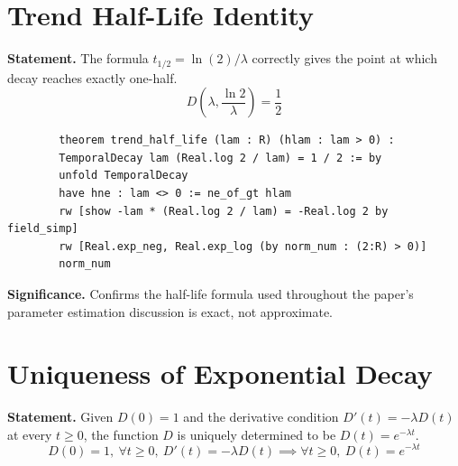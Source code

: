 \documentclass[11pt,a4paper]{article}
\begin{document}
	\section{Trend Half-Life Identity}
	
	\textbf{Statement.} The formula $t_{1/2} = \ln(2)/\lambda$ correctly gives the point at which decay reaches exactly one-half.
	\begin{equation}
		D\left(\lambda, \frac{\ln 2}{\lambda}\right) = \frac{1}{2}
	\end{equation}
	
	\begin{lstlisting}
		theorem trend_half_life (lam : R) (hlam : lam > 0) :
		TemporalDecay lam (Real.log 2 / lam) = 1 / 2 := by
		unfold TemporalDecay
		have hne : lam <> 0 := ne_of_gt hlam
		rw [show -lam * (Real.log 2 / lam) = -Real.log 2 by field_simp]
		rw [Real.exp_neg, Real.exp_log (by norm_num : (2:R) > 0)]
		norm_num
	\end{lstlisting}
	
	\noindent\textbf{Significance.} Confirms the half-life formula used throughout the paper's parameter estimation discussion is exact, not approximate.
	
	\section{Uniqueness of Exponential Decay}
	
	\textbf{Statement.} Given $D(0) = 1$ and the derivative condition $D'(t) = -\lambda D(t)$ at every $t \geq 0$, the function $D$ is uniquely determined to be $D(t) = e^{-\lambda t}$.
	\begin{equation}
		D(0)=1,\ \forall t \geq 0,\ D'(t) = -\lambda D(t) \implies \forall t \geq 0,\ D(t) = e^{-\lambda t}
	\end{equation}
	
\end{document}
